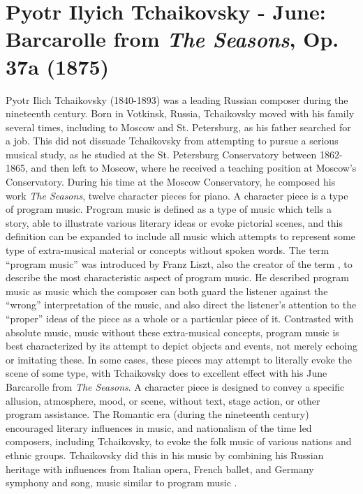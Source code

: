 \chapter[Tchaikovsky and \textit{The Seasons}, Op. 37a]{Pyotr Ilyich Tchaikovsky - June: Barcarolle from \textit{The Seasons}, Op. 37a (1875)}

Pyotr Ilich Tchaikovsky (1840-1893) was a leading Russian composer during the nineteenth century. Born in Votkinsk, Russia, Tchaikovsky moved with his family several times, including to Moscow and St. Petersburg, as his father searched for a job\autocite{Burkholder_Grout_Palisca_2014}. This did not dissuade Tchaikovsky from attempting to pursue a serious musical study, as he studied at the St. Petersburg Conservatory between 1862-1865, and then left to Moscow, where he received a teaching position at Moscow's Conservatory. During his time at the Moscow Conservatory, he composed his work \textit{The Seasons}, twelve character pieces for piano. A character piece is a type of program music. Program music is defined as a type of music which tells a story, able to illustrate various literary ideas or evoke pictorial scenes\autocite{Kennedy_Kennedy_Rutherford-Johnson_2013_programme_music}, and this definition can be expanded to include all music which attempts to represent some type of extra-musical material or concepts without spoken words\autocite{Scruton_2001}. The term ``program music'' was introduced by Franz Liszt, also the creator of the term , to describe the most characteristic aspect of program music. He described program music as music which the composer can both guard the listener against the ``wrong'' interpretation of the music, and also direct the listener's attention to the ``proper'' ideas of the piece as a whole or a particular piece of it. Contrasted with absolute music, music without these extra-musical concepts, program music is best characterized by its attempt to depict objects and events, not merely echoing or imitating these. In some cases, these pieces may attempt to literally evoke the scene of some type, with Tchaikovsky does to excellent effect with his June Barcarolle from \textit{The Seasons}. A character piece is designed to convey a specific allusion, atmosphere, mood, or scene, without text, stage action, or other program assistance\autocite{Temperley_2011}. The Romantic era (during the nineteenth century) encouraged literary influences in music, and nationalism of the time led composers, including Tchaikovsky, to evoke the folk music of various nations and ethnic groups. Tchaikovsky did this in his music by combining his Russian heritage with influences from Italian opera, French ballet, and Germany symphony and song, music similar to program music \autocite{Burkholder_Grout_Palisca_2014}.

